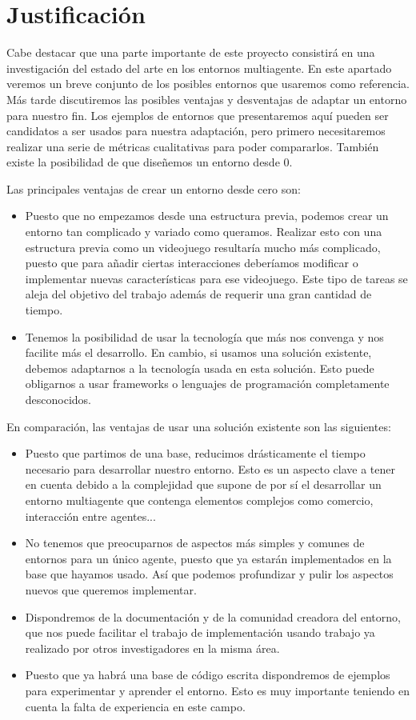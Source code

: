 \section{Justificación}
Cabe destacar que una parte importante de este proyecto consistirá en una investigación del estado del arte en los entornos multiagente. En este apartado veremos un breve conjunto de los posibles entornos que usaremos como referencia. Más tarde discutiremos las posibles ventajas y desventajas de adaptar un entorno para nuestro fin. Los ejemplos de entornos que presentaremos aquí pueden ser candidatos a ser usados para nuestra adaptación, pero primero necesitaremos realizar una serie de métricas cualitativas para poder compararlos. También existe la posibilidad de que diseñemos un entorno desde 0.  

Las principales ventajas de crear un entorno desde cero son:
\begin{itemize}
    \item Puesto que no empezamos desde una estructura previa, podemos crear un entorno tan complicado y variado como queramos. Realizar esto con una estructura previa como un videojuego resultaría mucho más complicado, puesto que para añadir ciertas interacciones deberíamos modificar o implementar nuevas características para ese videojuego. Este tipo de tareas se aleja del objetivo del trabajo además de requerir una gran cantidad de tiempo.
    \item Tenemos la posibilidad de usar la tecnología que más nos convenga y nos facilite más el desarrollo. En cambio, si usamos una solución existente, debemos adaptarnos a la tecnología usada en esta solución. Esto puede obligarnos a usar frameworks o lenguajes de programación completamente desconocidos.  
\end{itemize}

En comparación, las ventajas de usar una solución existente son las siguientes:

\begin{itemize}
    \item Puesto que partimos de una base, reducimos drásticamente el tiempo necesario para desarrollar nuestro entorno. Esto es un aspecto clave a tener en cuenta debido a la complejidad que supone de por sí el desarrollar un entorno multiagente que contenga elementos complejos como comercio, interacción entre agentes...
    \item No tenemos que preocuparnos de aspectos más simples y comunes de entornos para un único agente, puesto que ya estarán implementados en la base que hayamos usado. Así que podemos profundizar y pulir los aspectos nuevos que queremos implementar.
    \item Dispondremos de la documentación y de la comunidad creadora del entorno, que nos puede facilitar el trabajo de implementación usando trabajo ya realizado por otros investigadores en la misma área.
    \item Puesto que ya habrá una base de código escrita dispondremos de ejemplos para experimentar y aprender el entorno. Esto es muy importante teniendo en cuenta la falta de experiencia en este campo.
\end{itemize}

